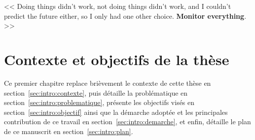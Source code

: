 \begin{savequote}[6cm]
<< Doing things didn't work, not doing things didn't work, and I couldn't predict the future either, so I only had one other choice. \textbf{Monitor everything}. >>
\end{savequote}
\chapter{Contexte et objectifs de la thèse}
\chaptertoc

Ce premier chapitre replace brièvement le contexte de cette thèse en section~\ref{sec:intro:contexte}, puis détaille la problématique en section~\ref{sec:intro:problematique}, présente les objectifs visés en section~\ref{sec:intro:objectif} ainsi que la démarche adoptée et les principales contribution de ce travail en section~\ref{sec:intro:demarche}, et enfin, détaille le plan de ce manuscrit en section~\ref{sec:intro:plan}.






